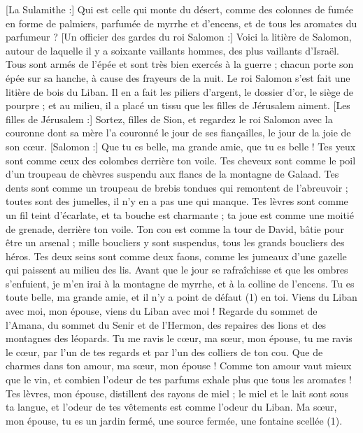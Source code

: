 \begin{multicols}{2}
[La Sulamithe :] Qui est celle qui monte du désert, comme des colonnes de fumée en forme de palmiers, parfumée de myrrhe et d'encens, et de tous les aromates du parfumeur ?
[Un officier des gardes du roi Salomon :] Voici la litière de Salomon, autour de laquelle il y a soixante vaillants hommes, des plus vaillants d'Israël.
Tous sont armés de l'épée et sont très bien exercés à la guerre ; chacun porte son épée sur sa hanche, à cause des frayeurs de la nuit.
Le roi Salomon s'est fait une litière de bois du Liban.
Il en a fait les piliers d’argent, le dossier d’or, le siège de pourpre ; et au milieu, il a placé un tissu que les filles de Jérusalem aiment.
[Les filles de Jérusalem :] Sortez, filles de Sion, et regardez le roi Salomon avec la couronne dont sa mère l'a couronné le jour de ses fiançailles, le jour de la joie de son cœur.
\VerseOne{}[Salomon :] Que tu es belle, ma grande amie, que tu es belle ! Tes yeux sont comme ceux des colombes derrière ton voile. Tes cheveux sont comme le poil d'un troupeau de chèvres suspendu aux flancs de la montagne de Galaad.
Tes dents sont comme un troupeau de brebis tondues qui remontent de l’abreuvoir ; toutes sont des jumelles, il n’y en a pas une qui manque.
Tes lèvres sont comme un fil teint d’écarlate, et ta bouche est charmante ; ta joue est comme une moitié de grenade, derrière ton voile.
Ton cou est comme la tour de David, bâtie pour être un arsenal ; mille boucliers y sont suspendus, tous les grands boucliers des héros.
Tes deux seins sont comme deux faons, comme les jumeaux d'une gazelle qui paissent au milieu des lis.
Avant que le jour se rafraîchisse et que les ombres s'enfuient, je m'en irai à la montagne de myrrhe, et à la colline de l'encens.
Tu es toute belle, ma grande amie, et il n'y a point de défaut (1) en toi.
Viens du Liban avec moi, mon épouse, viens du Liban avec moi ! Regarde du sommet de l'Amana, du sommet du Senir et de l’Hermon, des repaires des lions et des montagnes des léopards.
Tu me ravis le cœur, ma sœur, mon épouse, tu me ravis le cœur, par l'un de tes regards et par l'un des colliers de ton cou.
Que de charmes dans ton amour, ma sœur, mon épouse ! Comme ton amour vaut mieux que le vin, et combien l'odeur de tes parfums exhale plus que tous les aromates !
Tes lèvres, mon épouse, distillent des rayons de miel ; le miel et le lait sont sous ta langue, et l'odeur de tes vêtements est comme l'odeur du Liban.
Ma sœur, mon épouse, tu es un jardin fermé, une source fermée, une fontaine scellée (1).

\end{multicols}
